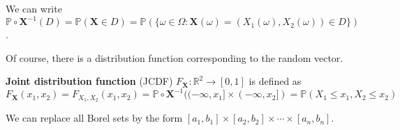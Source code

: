 \documentclass{huhtakm-template-book}
\newcommand{\prob}{\mathbb{P}}
\begin{document}
\begin{rem}
	We can write $\prob\circ\mathbf{X}^{-1}(D)=\prob(\mathbf{X}\in D)=\prob(\{\omega\in\Omega:\mathbf{X}(\omega)=(X_{1}(\omega),X_{2}(\omega))\in D\})$.
\end{rem}
Of course, there is a distribution function corresponding to the random vector.
\begin{defn}
	\textbf{Joint distribution function} (JCDF) $F_{\mathbf{X}}:\mathbb{R}^{2}\to [0,1]$ is defined as
	\begin{equation*}
		F_{\mathbf{X}}(x_{1},x_{2})=F_{X_{1},X_{2}}(x_{1},x_{2})=\prob\circ\mathbf{X}^{-1}((-\infty,x_{1}]\times(-\infty,x_{2}])=\prob(X_{1}\leq x_{1},X_{2}\leq x_{2})
	\end{equation*}
\end{defn}
\begin{rem}
	We can replace all Borel sets by the form $[a_{1},b_{1}]\times[a_{2},b_{2}]\times\cdots\times[a_{n},b_{n}]$.
\end{rem}
\end{document}
